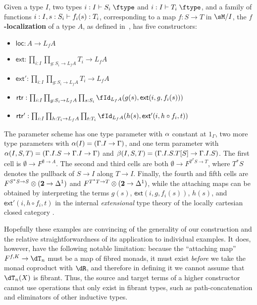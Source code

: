 \documentclass{amsart}
\let\type\fibtype
\begin{document}
\begin{eg} \label{eg:localization}
  Given a type $I$, two types $i:I\types S_i\type$ and $i:I\types T_i\type$, and a family of functions $i:I,s:S_i \vdash f_i(s) : T_i$, corresponding to a map $f:S\to T$ in $\sM/I$, the \textbf{$f$-localization} of a type $A$, as defined in~\cite{rss:modalities}, has five constructors:
  \begin{itemize}
  \item $\mathsf{loc}:A\to L_f A$
  \item $\mathsf{ext}:\prod_{i:I} \prod_{g:S_i \to L_f A} T_i \to L_f A$
  \item $\mathsf{ext}':\prod_{i:I} \prod_{g:S_i \to L_f A} T_i \to L_f A$
  \item $\mathsf{rtr}:\prod_{i:I} \prod_{g:S_i \to L_f A} \prod_{s:S_i} \id[L_f A]{g(s)}{\mathsf{ext}(i,g,f_i(s))}$
  \item $\mathsf{rtr}':\prod_{i:I} \prod_{h:T_i \to L_f A} \prod_{t:T_i} \id[L_f A]{h(s)}{\mathsf{ext}'(i,h\circ f_i,t)}$
  \end{itemize}
  The parameter scheme has one type parameter with $\alpha$ constant at $1_\Gamma$, two more type parameters with $\alpha(I) = (\Gamma.I\to\Gamma)$, and one term parameter with $\alpha(I,S,T) = (\Gamma.I.S\to \Gamma.I\to\Gamma)$ and $\beta(I,S,T) = (\Gamma.I.S.T[S] \to \Gamma.I.S)$.
  The first cell is $\emptyset \to F^{\emptyset\to A}$.
  The second and third cells are both $\emptyset \to F^{T^*S \to T}$, where $T^*S$ denotes the pullback of $S\to I$ along $T\to I$.
  Finally, the fourth and fifth cells are $F^{S^*S\to S} \otimes (\mathbf{2}\to {\Delta^1})$ and $F^{T^*T\to T} \otimes (\mathbf{2}\to {\Delta^1})$, while the attaching maps can be obtained by interpreting the terms $g(s)$, ${\mathsf{ext}(i,g,f_i(s))}$, $h(s)$, and ${\mathsf{ext}'(i,h\circ f_i,t)}$ in the internal \emph{extensional} type theory of the locally cartesian closed category \sM.
\end{eg}

Hopefully these examples are convincing of the generality of our construction and the relative straightforwardness of its application to individual examples.
It does, however, have the following notable limitation: because the ``attaching map'' $F^{f,K}\to \dT_n$ must be a map of fibred monads, it must exist \emph{before} we take the monad coproduct with $\dR$, and therefore in defining it we cannot assume that $\dT_n(X)$ is fibrant.
Thus, the source and target terms of a higher constructor cannot use operations that only exist in fibrant types, such as path-concatenation and eliminators of other inductive types.
\end{document}
